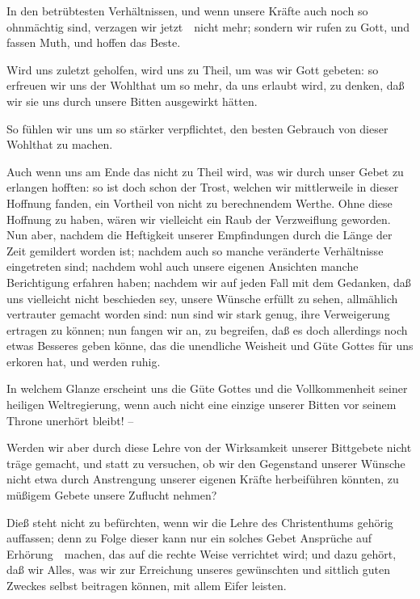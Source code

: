 \begin{aufza}
\begin{aufzb}
\item In den betrübtesten Verhältnissen, und wenn unsere Kräfte auch noch so ohnmächtig sind, verzagen wir jetzt~\ nicht mehr; sondern wir rufen zu Gott, und fassen Muth, und hoffen das Beste.
\item Wird uns zuletzt geholfen, wird uns zu Theil, um was wir Gott gebeten: so erfreuen wir uns der Wohlthat um so mehr, da uns erlaubt wird, zu denken, daß wir sie uns durch unsere Bitten ausgewirkt hätten.
\item So fühlen wir uns um so stärker verpflichtet, den besten Gebrauch von dieser Wohlthat zu machen.
\item Auch wenn uns am Ende das nicht zu Theil wird, was wir durch unser Gebet zu erlangen hofften: so ist doch schon der Trost, welchen wir mittlerweile in dieser Hoffnung fanden, ein Vortheil von nicht zu berechnendem Werthe. Ohne diese Hoffnung zu haben, wären wir vielleicht ein Raub der Verzweiflung geworden. Nun aber, nachdem die Heftigkeit unserer Empfindungen durch die Länge der Zeit gemildert worden ist; nachdem auch so manche veränderte Verhältnisse eingetreten sind; nachdem wohl auch unsere eigenen Ansichten manche Berichtigung erfahren haben; nachdem wir auf jeden Fall mit dem Gedanken, daß uns vielleicht nicht beschieden sey, unsere Wünsche erfüllt zu sehen, allmählich vertrauter gemacht worden sind: nun sind wir stark genug, ihre Verweigerung ertragen zu können; nun fangen wir an, zu begreifen, daß es doch allerdings noch etwas Besseres geben könne, das die unendliche Weisheit und Güte Gottes für uns erkoren hat, und werden ruhig.
\item In welchem Glanze erscheint uns die Güte Gottes und die Vollkommenheit seiner heiligen Weltregierung, wenn auch nicht eine einzige unserer Bitten vor seinem Throne unerhört bleibt! --
\end{aufzb}\par
{} Werden wir aber durch diese Lehre von der Wirksamkeit unserer Bittgebete nicht träge gemacht, und statt zu versuchen, ob wir den Gegenstand unserer Wünsche nicht etwa durch Anstrengung unserer eigenen Kräfte herbeiführen könnten, zu müßigem Gebete unsere Zuflucht nehmen?\par
{} Dieß steht nicht zu befürchten, wenn wir die Lehre des Christenthums gehörig auffassen; denn zu Folge dieser kann nur ein solches Gebet Ansprüche auf Erhörung~\ machen, das auf die rechte Weise verrichtet wird; und dazu gehört, daß wir Alles, was wir zur Erreichung unseres gewünschten und sittlich guten Zweckes selbst beitragen können, mit allem Eifer leisten.

\end{aufza}

